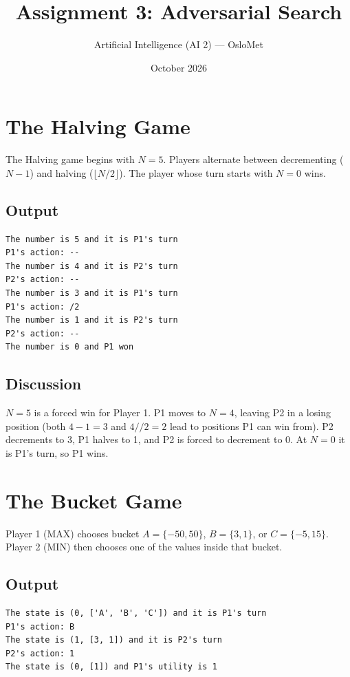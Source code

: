 \documentclass[11pt,a4paper]{article}
\title{\textbf{Assignment 3: Adversarial Search}}
\author{Artificial Intelligence (AI 2) --- OsloMet}
\date{October 2026}
\begin{document}
\maketitle

\section{The Halving Game}

The Halving game begins with $N = 5$. Players alternate between decrementing ($N - 1$) and halving ($\lfloor N/2 \rfloor$). The player whose turn starts with $N = 0$ wins.

\subsection{Output}
\begin{lstlisting}[style=terminaloutput]
The number is 5 and it is P1's turn
P1's action: --
The number is 4 and it is P2's turn
P2's action: --
The number is 3 and it is P1's turn
P1's action: /2
The number is 1 and it is P2's turn
P2's action: --
The number is 0 and P1 won
\end{lstlisting}

\subsection{Discussion}
$N = 5$ is a forced win for Player 1. P1 moves to $N = 4$, leaving P2 in a losing position (both $4 - 1 = 3$ and $4 // 2 = 2$ lead to positions P1 can win from). P2 decrements to 3, P1 halves to 1, and P2 is forced to decrement to 0. At $N = 0$ it is P1's turn, so P1 wins.

\section{The Bucket Game}

Player 1 (MAX) chooses bucket $A = \{-50, 50\}$, $B = \{3, 1\}$, or $C = \{-5, 15\}$. Player 2 (MIN) then chooses one of the values inside that bucket.

\subsection{Output}
\begin{lstlisting}[style=terminaloutput]
The state is (0, ['A', 'B', 'C']) and it is P1's turn
P1's action: B
The state is (1, [3, 1]) and it is P2's turn
P2's action: 1
The state is (0, [1]) and P1's utility is 1
\end{lstlisting}
\end{document}
